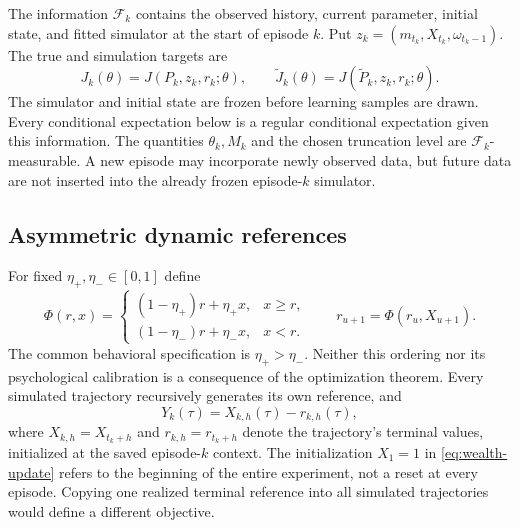 \documentclass[11pt]{article}
\newcommand{\1}{\mathbf 1}
\newcommand{\cF}{\mathcal F}
\theoremstyle{definition}
\begin{document}
The information $\cF_k$ contains the observed history, current parameter, initial state, and fitted simulator at the start of episode $k$. Put $z_k=(m_{t_k},X_{t_k},\omega_{t_k-1})$. The true and simulation targets are
\begin{equation}\label{eq:conditional-targets}
 J_k(\theta)=J(P_k,z_k,r_k;\theta),\qquad
 \widetilde J_k(\theta)=J(\widetilde P_k,z_k,r_k;\theta).
\end{equation}
The simulator and initial state are frozen before learning samples are drawn. Every conditional expectation below is a regular conditional expectation given this information. The quantities $\theta_k,M_k$ and the chosen truncation level are $\cF_k$-measurable. A new episode may incorporate newly observed data, but future data are not inserted into the already frozen episode-$k$ simulator.

\subsection{Asymmetric dynamic references}
For fixed $\eta_+,\eta_-\in[0,1]$ define
\begin{equation}\label{eq:reference-update}
 \Phi(r,x)=
 \begin{cases}(1-\eta_+)r+\eta_+x,&x\ge r,\\
 (1-\eta_-)r+\eta_-x,&x<r.
 \end{cases}
 \qquad r_{u+1}=\Phi(r_u,X_{u+1}).
\end{equation}
The common behavioral specification is $\eta_+>\eta_-$. Neither this ordering nor its psychological calibration is a consequence of the optimization theorem. Every simulated trajectory recursively generates its own reference, and
\begin{equation}\label{eq:relative-outcome}
 Y_k(\tau)=X_{k,h}(\tau)-r_{k,h}(\tau),
\end{equation}
where $X_{k,h}=X_{t_k+h}$ and $r_{k,h}=r_{t_k+h}$ denote the trajectory's terminal values, initialized at the saved episode-$k$ context. The initialization $X_1=1$ in \eqref{eq:wealth-update} refers to the beginning of the entire experiment, not a reset at every episode. Copying one realized terminal reference into all simulated trajectories would define a different objective.
\end{document}
